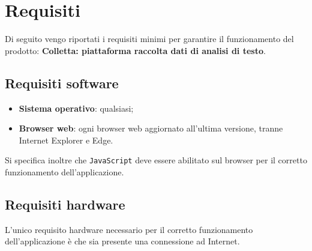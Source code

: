 \section{Requisiti}

    Di seguito vengo riportati i requisiti minimi per garantire il funzionamento del prodotto: 
\textbf{Colletta: piattaforma raccolta dati di analisi di testo}. 


\subsection{Requisiti software}
\begin{itemize}
\item \textbf{Sistema operativo}: qualsiasi;
\item \textbf{Browser web}: ogni browser web aggiornato all'ultima versione, tranne Internet Explorer e Edge.
\end{itemize}
Si specifica inoltre che \texttt{JavaScript} deve essere abilitato sul browser per il corretto funzionamento dell’applicazione.

\subsection{Requisiti hardware}
L'unico requisito hardware necessario per il corretto funzionamento dell'applicazione è che sia presente una connessione ad Internet. 
\newpage
